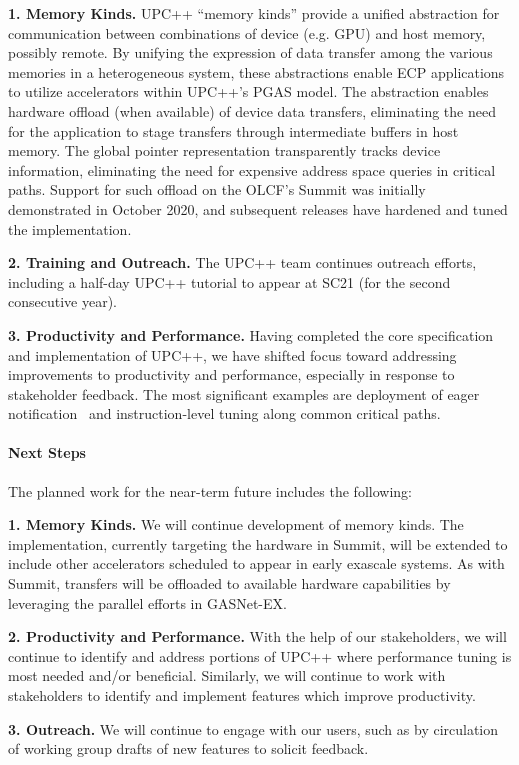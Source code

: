 \textbf{1. Memory Kinds.}
UPC++ ``memory kinds'' provide a unified abstraction for communication between
combinations of device (e.g. GPU) and host memory, possibly remote.  By
unifying the expression of data transfer among the various memories in a
heterogeneous system, these abstractions enable ECP
applications to utilize accelerators within UPC++'s PGAS model.  The
abstraction enables hardware offload (when available) of device data transfers,
eliminating the need for the application to stage transfers through
intermediate buffers in host memory.
The global pointer representation transparently tracks device information,
eliminating the need for expensive address space queries in critical paths.
Support for such offload on the OLCF's
Summit was initially demonstrated in October 2020, and subsequent releases
have hardened and tuned the implementation.

\textbf{2. Training and Outreach.}
The UPC++ team continues outreach efforts, including a half-day UPC++
tutorial to appear at SC21 (for the second consecutive year).

\textbf{3. Productivity and Performance.}
Having completed the core specification and implementation of UPC++, we have
shifted focus toward addressing improvements to productivity and performance,
especially in response to stakeholder feedback.  The most significant
examples are deployment of eager notification~\cite{pawatm21-upcxx-as_eager} 
and instruction-level tuning along common critical paths.

\paragraph{Next Steps}

The planned work for the near-term future includes the following:

\textbf{1. Memory Kinds.}
We will continue development of memory kinds.  The
implementation, currently targeting the hardware in Summit, will be extended to
include other accelerators scheduled to appear in early exascale systems.
As with Summit, transfers will be offloaded to available hardware capabilities
by leveraging the parallel efforts in GASNet-EX.

\textbf{2. Productivity and Performance.}
With the help of our stakeholders, we will continue to identify and address
portions of UPC++ where performance tuning is most needed
and/or beneficial.  Similarly, we will continue to work with stakeholders to
identify and implement features which improve productivity.

\textbf{3. Outreach.}
We will continue to engage with our users, such as by circulation of working
group drafts of new features to solicit feedback.
